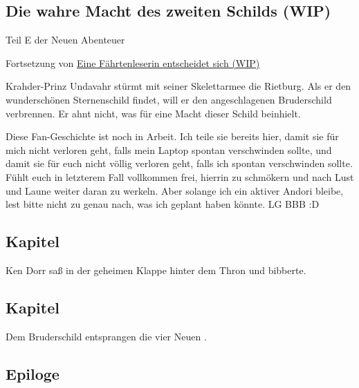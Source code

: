 \begin{chapterbox}
    \chapter{Die wahre Macht des zweiten Schilds (WIP)}
    \label{wip-die-wahre-macht-des-zweiten-schilds}
    
    \begin{center}
        Teil E der Neuen Abenteuer

        Fortsetzung von \hyperref[wip-eine-faehrtenleserin-entscheidet-sich]{Eine Fährtenleserin entscheidet sich (WIP)}
    \end{center}

    Krahder-Prinz Undavahr stürmt mit seiner Skelettarmee die Rietburg. Als er den wunderschönen Sternenschild findet, will er den angeschlagenen Bruderschild verbrennen. Er ahnt nicht, was für eine Macht dieser Schild beinhielt. 
\end{chapterbox}



Diese Fan-Geschichte ist noch in Arbeit. Ich teile sie bereits hier, damit sie für mich nicht verloren geht, falls mein Laptop spontan verschwinden sollte, und damit sie für euch nicht völlig verloren geht, falls ich spontan verschwinden sollte. Fühlt euch in letzterem Fall vollkommen frei, hierrin zu schmökern und nach Lust und Laune weiter daran zu werkeln. Aber solange ich ein aktiver Andori bleibe, lest bitte nicht zu genau nach, was ich geplant haben könnte. LG BBB :D



\newpage
\section{Kapitel}

Ken Dorr saß in der geheimen Klappe hinter dem Thron und bibberte.





\newpage
\section{Kapitel}

Dem Bruderschild entsprangen die vier Neuen .







\newpage
\section{Epiloge}


